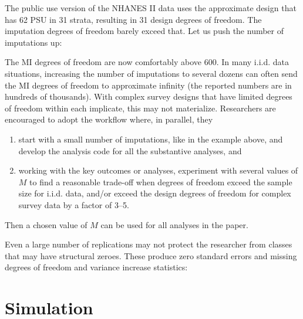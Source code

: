 \begin{stlog}
\nullskip
\end{stlog}

The public use version of the NHANES II data uses the approximate
design that has 62 PSU in 31 strata, resulting in 31 design degrees 
of freedom. The imputation degrees of freedom barely exceed that.
Let us push the number of imputations up:

\begin{stlog}
\nullskip
\end{stlog}

The MI degrees of freedom are now comfortably above 600.
In many i.i.d. data situations, increasing the number of imputations
to several dozens can often send the MI degrees of freedom to 
approximate infinity (the reported numbers are in hundreds 
of thousands). With complex survey designs that have limited
degrees of freedom within each implicate, this may not materialize.
Researchers are encouraged to adopt the workflow where, in parallel,
they

\begin{enumerate}
  \item start with a small number of imputations, like 
        in the example above, and develop the analysis code for all
        the substantive analyses, and
  \item working with the key outcomes or analyses, 
        experiment with several values of $M$ to find a reasonable
        trade-off when degrees of freedom exceed the sample size 
        for i.i.d. data, and/or exceed the design degrees of freedom
        for complex survey data by a factor of 3--5.
\end{enumerate}

Then a chosen value of $M$ can be used for all analyses in the paper.

Even a large number of replications may not protect the researcher
from classes that may have structural zeroes. These produce
zero standard errors and missing degrees of freedom and 
variance increase statistics:

\begin{stlog}
\nullskip
\end{stlog}

\section{Simulation}

